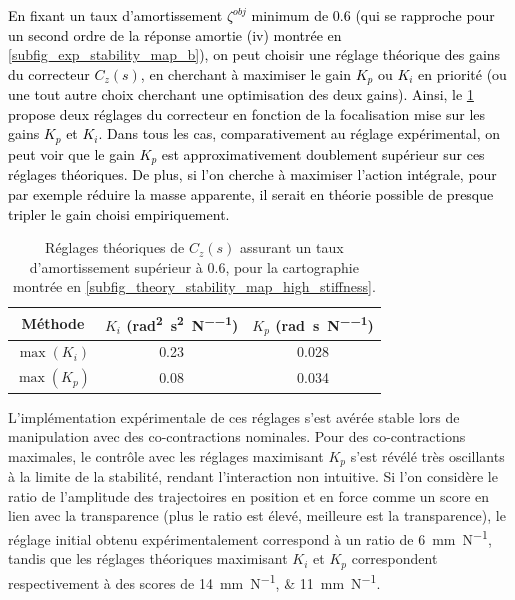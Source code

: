 \textcolor{black}{En fixant un taux d'amortissement $\zeta^{obj}$ minimum de 0.6 (qui se rapproche pour un second ordre de la réponse amortie (iv) montrée en \cref{subfig_exp_stability_map_b}), on peut choisir une réglage théorique des gains du correcteur $C_z(s)$, en cherchant à maximiser le gain $K_p$ ou $K_i$ en priorité (ou une tout autre choix cherchant une optimisation des deux gains). %
Ainsi, le \cref{tab_theoretical_tunning} propose deux réglages du correcteur en fonction de la focalisation mise sur les gains $K_p$ et $K_i$. Dans tous les cas, comparativement au réglage expérimental, on peut voir que le gain $K_p$ est approximativement doublement supérieur sur ces réglages théoriques. De plus, si l'on cherche à maximiser l'action intégrale, pour par exemple réduire la masse apparente, il serait en théorie possible de presque tripler le gain choisi empiriquement.} %

\begin{table}
	\centering
	\begin{tabular}{| c | c | c |}
		\hline%
		\textbf{Méthode} & $K_i$ (\si{\radian\squared\per\second\squared\per\newton}) & $K_p$ (\si{\radian\per\second\per\newton})\\\hline%
		$\max(K_i)$ & 0.23 & 0.028\\
		$\max(K_p)$ & 0.08 & 0.034\\
		\hline
	\end{tabular}
	\caption[Réglages théoriques du correcteur en admittance]{Réglages théoriques de $C_z(s)$ assurant un taux d'amortissement supérieur à 0.6, pour la cartographie montrée en \cref{subfig_theory_stability_map_high_stiffness}.}
	\label{tab_theoretical_tunning}
\end{table}

L'implémentation expérimentale de ces réglages s'est avérée stable lors de manipulation avec des co-contractions nominales. Pour des co-contractions maximales, le contrôle avec les réglages maximisant $K_p$ s'est révélé très oscillants à la limite de la stabilité, rendant l'interaction non intuitive. %
Si l'on considère le ratio de l'amplitude des trajectoires en position et en force comme un score en lien avec la transparence (plus le ratio est élevé, meilleure est la transparence), le réglage initial obtenu expérimentalement correspond à un ratio de \SI{6}{\milli\meter\per\newton}, tandis que les réglages théoriques maximisant $K_i$ et $K_p$ correspondent respectivement à des scores de \SIlist{14;11}{\milli\meter\per\newton}.

